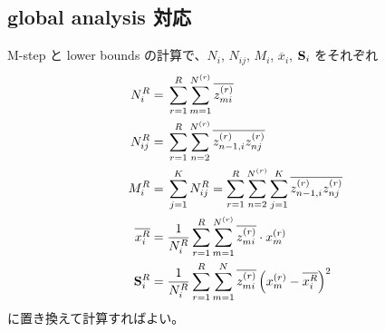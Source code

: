 \subsection{ global analysis 対応 }

M-step と lower bounds の計算で、$N_i$, $N_{ij}$, $M_i$, $\overline{x}_i$, ${\bf S}_i$ をそれぞれ
\begin{align}
  N_i^R  =\;&  \sum_{r=1}^R \sum_{m=1}^{N^{(r)}} \overline{z_{mi}^{(r)}}  \\
  N_{ij}^R  =\;&  \sum_{r=1}^R \sum_{n=2}^{N^{(r)}} \overline{ z_{n-1, i}^{(r)} z_{nj}^{(r)} }  \\
  M_i^R  =\;&  \sum_{j=1}^K N_{ij}^R = \sum_{r=1}^R \sum_{n=2}^{N^{(r)}} \sum_{j=1}^K \overline{ z_{n-1, i}^{(r)} z_{nj}^{(r)} }  \\
  \overline{x_i^R}  =\;&  \frac{1}{N_i^R} \sum_{r=1}^R \sum_{m=1}^{N^{(r)}} \overline{z_{mi}^{(r)}} \cdot x_m^{(r)}  \\
  {\bf S}_i^R  =\;&  \frac{1}{N_i^R} \sum_{r=1}^R \sum_{m=1}^N \overline{z_{mi}^{(r)}} \left(x_m^{(r)} - \overline{x_i^R} \right)^2
\end{align}
に置き換えて計算すればよい。


%
